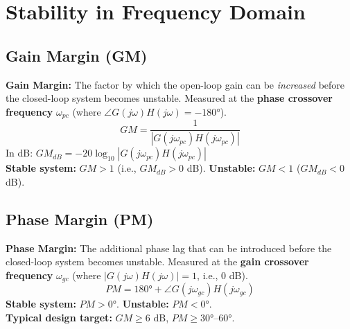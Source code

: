 \documentclass[12pt,a4paper]{article}
\begin{document}
\section{Stability in Frequency Domain}

\subsection{Gain Margin (GM)}

\begin{tcolorbox}[defbox]
\textbf{Gain Margin:} The factor by which the open-loop gain can be \textit{increased} before the closed-loop system becomes unstable. Measured at the \textbf{phase crossover frequency} $\omega_{pc}$ (where $\angle G(j\omega)H(j\omega) = -180°$).
$$GM = \frac{1}{|G(j\omega_{pc})H(j\omega_{pc})|}$$
In dB: $GM_{dB} = -20\log_{10}|G(j\omega_{pc})H(j\omega_{pc})|$\\[4pt]
\textbf{Stable system:} $GM > 1$ (i.e., $GM_{dB} > 0$ dB). \quad \textbf{Unstable:} $GM < 1$ ($GM_{dB} < 0$ dB).
\end{tcolorbox}

\subsection{Phase Margin (PM)}

\begin{tcolorbox}[defbox]
\textbf{Phase Margin:} The additional phase lag that can be introduced before the closed-loop system becomes unstable. Measured at the \textbf{gain crossover frequency} $\omega_{gc}$ (where $|G(j\omega)H(j\omega)| = 1$, i.e., 0 dB).
$$PM = 180° + \angle G(j\omega_{gc})H(j\omega_{gc})$$
\textbf{Stable system:} $PM > 0°$. \quad \textbf{Unstable:} $PM < 0°$.\\[4pt]
\textbf{Typical design target:} $GM \geq 6$ dB, $PM \geq 30°$--$60°$.
\end{tcolorbox}
\end{document}
